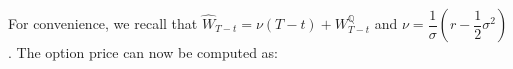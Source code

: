 \documentclass[12pt]{article}
\begin{document}
For convenience, we recall that $\widehat{W}_{T-t}=\nu (T-t)+W_{T-t}^\mathbb{Q}$ and $\nu=\dfrac{1}{\sigma}(r-\dfrac{1}{2}\sigma^2)$.
The option price can now be computed as:
\end{document}
